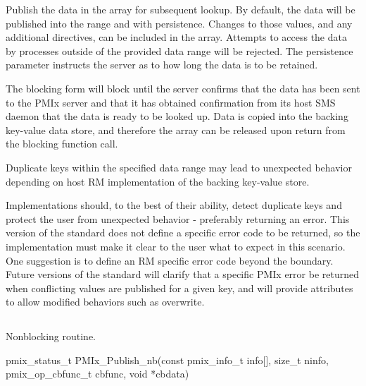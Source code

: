 \descr

Publish the data in the  array for subsequent lookup.
By default, the data will be published into the  range and with  persistence.
Changes to those values, and any additional directives, can be included in the  array. Attempts to access the data by processes outside of the provided data range will be rejected. The persistence parameter instructs the server as to how long the data is to be retained.

The blocking form will block until the server confirms that the data has been sent to the \ac{PMIx} server and that it has obtained confirmation from its host \ac{SMS} daemon that the data is ready to be looked up. Data is copied into the backing key-value data store, and therefore the  array can be released upon return from the blocking function call.

\adviceuserstart
Duplicate keys within the specified data range may lead to unexpected behavior depending
on host RM implementation of the backing key-value store.
\adviceuserend

\adviceimplstart
Implementations should, to the best of their ability, detect duplicate keys and protect the
user from unexpected behavior - preferably returning an error. This version of the
standard does not define a specific error code to be returned, so the implementation must
make it clear to the user what to expect in this scenario. One suggestion is to define an RM
specific error code beyond the  boundary. Future versions of the standard
will clarify that a specific \ac{PMIx} error be returned when conflicting values are published for a given
key, and will provide attributes to allow modified behaviors such as overwrite.
\adviceimplend

\subsection{}

\summary

Nonblocking  routine.

\format

\cspecificstart
\begin{codepar}
pmix_status_t
PMIx_Publish_nb(const pmix_info_t info[], size_t ninfo,
                pmix_op_cbfunc_t cbfunc, void *cbdata)
\end{codepar}
\cspecificend

